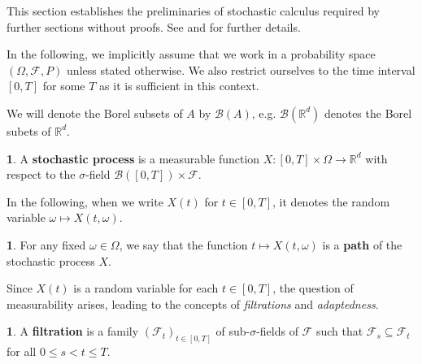 \documentclass[english]{article}
\numberwithin{equation}{section}
\numberwithin{figure}{section}
\theoremstyle{bolddescit}
\theoremstyle{definition}
\newtheorem{definition}[theorem]{\protect\definitionname}
\theoremstyle{definition}
\theoremstyle{plain}
\theoremstyle{plain}
\theoremstyle{bolddesc}
\theoremstyle{plain}
\theoremstyle{remark}
\providecommand{\definitionname}{Definition}
\begin{document}

This section establishes the preliminaries of stochastic calculus required by further sections without proofs. See \textcite{capinski_stochastic_2012} and \textcite{capinski_blackscholes_2012} for further details.

In the following, we implicitly assume that we work in a probability space $(\Omega, \mathcal{F}, P)$ unless stated otherwise. We also restrict ourselves to the time interval $[0,T]$ for some $T$ as it is sufficient in this context.

We will denote the Borel subsets of $A$ by $\mathcal{B}(A)$, e.g. $\mathcal{B}(\mathbb{R}^d)$ denotes the Borel subets of $\mathbb{R}^d$.

\begin{definition}
  A \textbf{stochastic process} is a measurable function $X : [0,T] \times \Omega \to \mathbb{R}^d$ with respect to the $\sigma$-field $\mathcal{B}([0,T]) \times \mathcal{F}$.
\end{definition}

In the following, when we write $X(t)$ for $t \in [0,T]$, it denotes the random variable $\omega \mapsto X(t, \omega)$.

\begin{definition}
  For any fixed $\omega \in \Omega$, we say that the function $t \mapsto X(t,\omega)$ is a \textbf{path} of the stochastic process $X$.
\end{definition}

Since $X(t)$ is a random variable for each $t \in [0,T]$, the question of measurability arises, leading to the concepts of \textit{filtrations} and \textit{adaptedness}.

\begin{definition}
  A \textbf{filtration} is a family $(\mathcal{F}_t)_{t \in [0,T]}$ of sub-$\sigma$-fields of $\mathcal{F}$ such that $\mathcal{F}_s \subseteq \mathcal{F}_t$ for all $0 \le s < t \le T$.
\end{definition}
\end{document}
